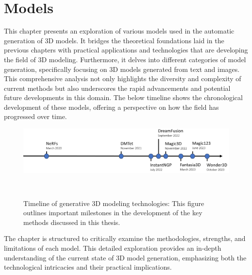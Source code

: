 \chapter{Models}\label{ch:models}

This chapter presents an exploration of various models used in the automatic generation of 3D models. It bridges the theoretical foundations laid in the previous chapters with practical applications and technologies that are developing the field of 3D modeling. Furthermore, it delves into different categories of model generation, specifically focusing on 3D models generated from text and images. This comprehensive analysis not only highlights the diversity and complexity of current methods but also underscores the rapid advancements and potential future developments in this domain. The below timeline shows the chronological development of these models, offering a perspective on how the field has progressed over time.

\begin{figure}[H]
    \centering
      \includegraphics[width=\textwidth]{figures/models/timelineMethods.png}
      \caption{Timeline of generative 3D modeling technologies: This figure outlines important milestones in the development of the key methods discussed in this thesis.}~\label{fig:timelineMethods}
\end{figure}

The chapter is structured to critically examine the methodologies, strengths, and limitations of each model. This detailed exploration provides an in-depth understanding of the current state of 3D model generation, emphasizing both the technological intricacies and their practical implications.




